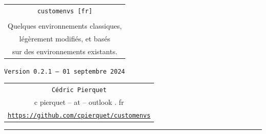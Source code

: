 \documentclass[french,11pt,a4paper]{article}
\def\TPversion{0.2.1}
\def\TPdate{01 septembre 2024}
\begin{document}
\pagestyle{fancy}

\thispagestyle{empty}

\begin{center}
	\begin{minipage}{0.75\linewidth}
	\begin{tcolorbox}[colframe=yellow,colback=yellow!15]
		\begin{center}
			\renewcommand\arraystretch{1.25}
			\begin{tabular}{c}
				{\Huge \texttt{customenvs [fr]}}\\
				\\
				{\Large Quelques environnements classiques,} \\
				{\Large légèrement modifiés, et basés} \\
				{\Large sur des environnements existants.} \\
			\end{tabular}
			\renewcommand\arraystretch{1}
			
			\medskip
			
			{\small \texttt{Version \TPversion{} -- \TPdate}}
		\end{center}
	\end{tcolorbox}
\end{minipage}
\end{center}

\vspace*{1mm}

\begin{center}
	\begin{tabular}{c}
	\texttt{Cédric Pierquet}\\
	{\ttfamily c pierquet -- at -- outlook . fr}\\
	\texttt{\url{https://github.com/cpierquet/customenvs}}
\end{tabular}
\end{center}

\vspace*{5mm}

%
%
%
%
%

\hrule


\hypertarget{matoc}{}
\end{document}
